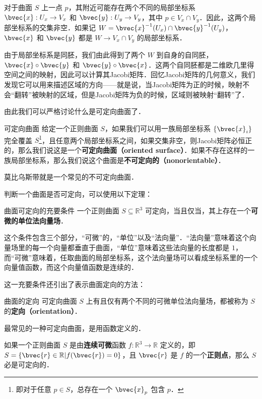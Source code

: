 

对于曲面 $S$ 上一点 $p$，其附近可能存在两个不同的局部坐标系 $\bvec{x}:U_x\to V_x$ 和 $\bvec{y}:U_y\to V_y$，其中 $p\in V_x\cap V_y$．因此，这两个局部坐标系的交集非空．如果记 $W=\bvec{x}^{-1}(U_x)\cap\bvec{y}^{-1}(U_y)$，$\bvec{x}$ 和 $\bvec{y}$ 都是 $W\to V_x\cap V_y$ 的局部坐标系．

由于局部坐标系是同胚，我们由此得到了两个 $W$ 到自身的自同胚，$\bvec{x}\circ\bvec{y}$ 和 $\bvec{y}\circ\bvec{x}$．这两个自同胚都是二维欧几里得空间之间的映射，因此可以计算其Jacobi矩阵．回忆Jacobi矩阵的几何意义，我们发现它可以用来描述区域的方向——就是说，当Jacobi矩阵为正的时候，映射不会“翻转”被映射的区域，但是Jacobi矩阵为负的时候，区域则被映射“翻转”了．

由此我们可以严格讨论什么是可定向曲面了．

\begin{definition}{可定向曲面}
给定一个正则曲面 $S$，如果我们可以用一族局部坐标系 $\{\bvec{x}_i\}$ 完全覆盖 $S$\footnote{即对于任意 $p\in S$，总存在一个 $\bvec{x}_p$ 包含 $p$．}，且任意两个局部坐标系之间，如果交集非空，则Jacobi矩阵必恒正的，那么我们说这是一个\textbf{可定向曲面（oriented surface）}．如果不存在这样的一族局部坐标系，那么我们说这个曲面是\textbf{不可定向的（nonorientable）}．
\end{definition}

莫比乌斯带就是一个常见的不可定向曲面．

判断一个曲面是否可定向，可以使用以下定理：

\begin{theorem}{曲面可定向的充要条件}
一个正则曲面 $S\subseteq \mathbb{R}^3$ 可定向，当且仅当，其上存在一个\textbf{可微的单位法向量场}．
\end{theorem}

这个条件包含三个部分，“可微”的，“单位”以及“法向量”．“法向量”意味着这个向量场里的每一个向量都垂直于曲面，“单位”意味着这些法向量的长度都是 $1$，而“可微”意味着，任取曲面的局部坐标系，这个法向量场可以看成坐标系里的一个向量值函数，而这个向量值函数是连续的．

这一充要条件还引出了表示曲面定向的方法：

\begin{definition}{曲面的定向}
可定向曲面 $S$ 上有且仅有两个不同的可微单位法向量场，都被称为 $S$ 的\textbf{定向（orientation）}．
\end{definition}

最常见的一种可定向曲面，是用函数定义的．

\begin{theorem}{}
如果一个正则曲面 $S$ 是由\textbf{连续可微}函数 $f:\mathbb{R}^3\to \mathbb{R}$ 定义的，即 $S=\{\bvec{r}\in\mathbb{R}|f(\bvec{r})=0\}$，且 $\bvec{r}$ 是 $f$ 的一个\textbf{正则点}，那么 $S$ 必是可定向的．
\end{theorem}






